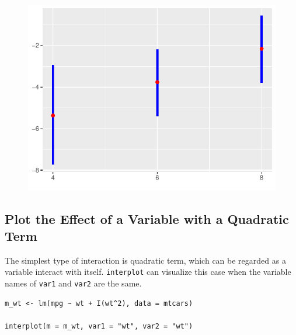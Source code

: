 \documentclass[
  article]{jss}
\begin{document}
\begin{figure}[H]

{\centering \includegraphics{jss_manuscript_files/figure-pdf/unnamed-chunk-8-1.pdf}

}

\end{figure}

\hypertarget{sec-plot-the-effect-of-a-variable-with-a-quadratic-term}{%
\subsection{Plot the Effect of a Variable with a Quadratic
Term}\label{sec-plot-the-effect-of-a-variable-with-a-quadratic-term}}

The simplest type of interaction is quadratic term, which can be
regarded as a variable interact with itself. \texttt{interplot} can
visualize this case when the variable names of \texttt{var1} and
\texttt{var2} are the same.

\begin{verbatim}
m_wt <- lm(mpg ~ wt + I(wt^2), data = mtcars)

interplot(m = m_wt, var1 = "wt", var2 = "wt")
\end{verbatim}
\end{document}
